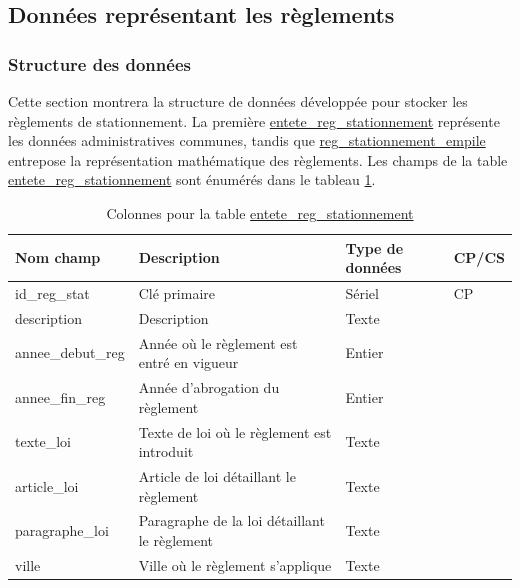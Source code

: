     
    \subsection{Données représentant les règlements} \label{ssec:survol-repres-reglements}
        \subsubsection{Structure des données}
            Cette section montrera la structure de données développée pour stocker les règlements de stationnement. La première \underline{entete\_reg\_stationnement} représente les données administratives communes, tandis que \underline{reg\_stationnement\_empile} entrepose la représentation mathématique des règlements. Les champs de la table \underline{entete\_reg\_stationnement} sont énumérés dans le tableau \ref{tab:definition_entete_reg_stationnement}.  \par
            \begin{table}[t]
                \caption{Colonnes pour la table \underline{entete\_reg\_stationnement}}
                \label{tab:definition_entete_reg_stationnement}
                \centering
                \begin{tabular}{m{}|m{}m{}m{}}
                    \hline
                    Nom champ & Description & Type de données & CP/CS  \\
                    \hline
                    id\_reg\_stat & Clé primaire  & Sériel & CP \\ 
                    description & Description & Texte & \\ 
                    annee\_debut\_reg & Année où le règlement est entré en vigueur & Entier & \\ 
                    annee\_fin\_reg & Année d'abrogation du règlement & Entier & \\ 
                    texte\_loi & Texte de loi où le règlement est introduit & Texte & \\
                    article\_loi & Article de loi détaillant le règlement & Texte & \\
                    paragraphe\_loi &  Paragraphe de la loi détaillant le règlement & Texte & \\ 
                    ville & Ville où le règlement s'applique & Texte & \\
                    \hline
                \end{tabular}
                
            \end{table}
